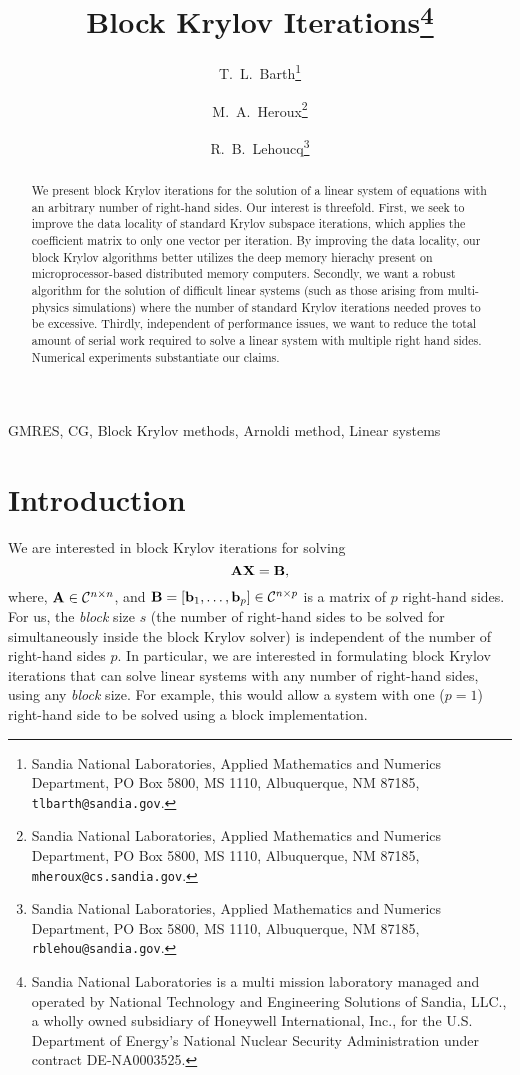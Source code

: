 \documentclass[twoside]{siamltex}
\title{Block Krylov Iterations\thanks{Sandia National Laboratories is a multi mission laboratory managed and operated by National Technology and Engineering Solutions of Sandia, LLC., a wholly owned subsidiary of Honeywell International, Inc., for the U.S. Department of Energy’s National Nuclear Security Administration under contract DE-NA0003525.}}
\author{T.~L.~Barth\thanks{Sandia National Laboratories, Applied Mathematics and Numerics Department,
 PO Box 5800, MS 1110,
 Albuquerque, NM 87185, {\tt tlbarth@sandia.gov}.}
 \and
M.~A.~Heroux\thanks{Sandia National Laboratories, Applied
Mathematics and Numerics Department, PO Box 5800, MS 1110,
Albuquerque, NM 87185, {\tt mheroux@cs.sandia.gov}.}
 \and
 R.~B.~Lehoucq\thanks{Sandia National Laboratories, Applied Mathematics
and Numerics Department,
 PO Box 5800, MS 1110,
Albuquerque, NM 87185, {\tt rblehou@sandia.gov}.
}
}
\newcommand{\bA}{{\bf A}}
\newcommand{\bB}{{\bf B}}
\newcommand{\bX}{{\bf X}}
\newcommand{\bb}{{\bf b}}
\newcommand{\eq}{\begin{equation}}
\newcommand{\eeq}{\end{equation}}
\begin{document}
\maketitle

\begin{abstract}
We present block Krylov iterations for the solution of a linear
system of equations with an arbitrary number of right-hand sides.
Our interest is threefold.  First, we seek to improve the data
locality of standard Krylov subspace iterations, which applies the
coefficient matrix to only one vector per iteration. By improving
the data locality, our block Krylov algorithms better utilizes the
deep memory hierachy present on microprocessor-based distributed
memory computers.  Secondly, we want a robust algorithm for the
solution of difficult linear systems (such as those arising from
multi-physics simulations) where the number of standard Krylov
iterations needed proves to be excessive.  Thirdly, independent of
performance issues, we want to reduce the total amount of serial
work required to solve a linear system with multiple right hand
sides. Numerical experiments substantiate our claims.

\end{abstract}

\begin{keywords}
GMRES, CG, Block Krylov methods, Arnoldi method, Linear systems
\end{keywords}
\begin{AMS}

\end{AMS}

\section{Introduction}
\label{intro}

We are interested in block Krylov iterations for solving
 \eq
 \bA \bX = \bB,
 \label{eq:blocklinsys}
 \eeq
where, $\bA \in {\cal C}^{n \times n}$, and $\bB = [\bb_1, \ldots,
\bb_p] \in {\cal C}^{n \times p}$ is a matrix of $p$ right-hand
sides. For us, the {\em block} size $s$ (the number of right-hand
sides to be solved for simultaneously inside the block Krylov
solver) is independent of the number of right-hand sides $p$. In
particular, we are interested in formulating block Krylov
iterations that can solve linear systems with any number of
right-hand sides, using any {\em block} size. For example, this
would allow a system with one ($p=1$) right-hand side to be solved
using a block implementation.
\end{document}
